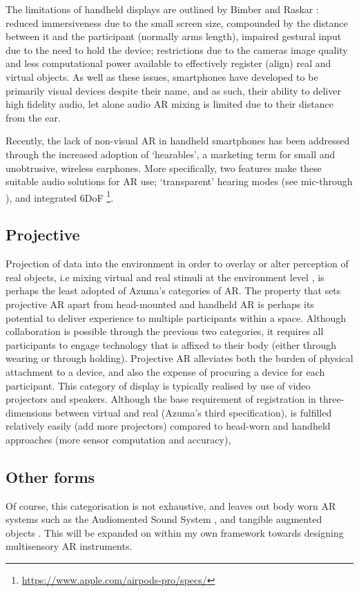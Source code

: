 The limitations of handheld displays are outlined by Bimber and Raskar \citeyearpar[pp. 79-83]{bimber2005}: reduced immersiveness due to the small screen size, compounded by the distance between it and the participant (normally arms length), impaired gestural input due to the need to hold the device; restrictions due to the cameras image quality and less computational power available to effectively register (align) real and virtual objects. As well as these issues, smartphones have developed to be primarily visual devices despite their name, and as such, their ability to deliver high fidelity audio, let alone audio AR mixing is limited due to their distance from the ear. 

Recently, the lack of non-visual AR in handheld smartphones has been addressed through the increased adoption of `hearables', a marketing term for small and unobtrusive, wireless earphones. More specifically, two features make these suitable audio solutions for AR use; `transparent' hearing modes (see mic-through \citep{lindeman2008}), and integrated 6DoF \footnote{\url{https://www.apple.com/airpods-pro/specs/}}.

\subsection{Projective}\label{sec: ar-forms-proj}
Projection of data into the environment in order to overlay or alter perception of real objects, i.e mixing virtual and real stimuli at the environment level \citep{lindeman2007}, is perhaps the least adopted of Azuma's categories of AR. The property that sets projective AR apart from head-mounted and handheld AR is perhaps its potential to deliver experience to multiple participants within a space. Although collaboration is possible through the previous two categories, it requires all participants to engage technology that is affixed to their body (either through wearing or through holding). Projective AR alleviates both the burden of physical attachment to a device, and also the expense of procuring a device for each participant. This category of display is typically realised by use of video projectors and speakers. Although the base requirement of registration in three-dimensions between virtual and real (Azuma's third specification), is fulfilled relatively easily (add more projectors) compared to head-worn and handheld approaches (more sensor computation and accuracy), 

\subsection{Other forms}\label{sec: ar-forms-other}
Of course, this categorisation is not exhaustive, and leaves out body worn AR systems such as the Audiomented Sound System \citep{chevalier2020}, and tangible augmented objects \citep{schraffenberger2015}. This will be expanded on within my own framework towards designing multisensory AR instruments.
